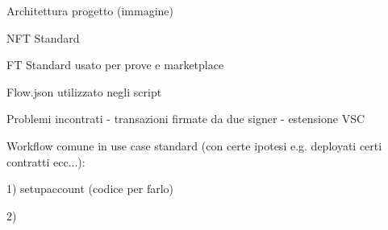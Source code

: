 Architettura progetto (immagine)

NFT Standard

FT Standard usato per prove e marketplace

Flow.json utilizzato negli script

Problemi incontrati 
 - transazioni firmate da due signer
 - estensione VSC

Workflow comune in use case standard (con certe ipotesi e.g. deployati certi contratti ecc...):

1) setupaccount (codice per farlo)

2) 



